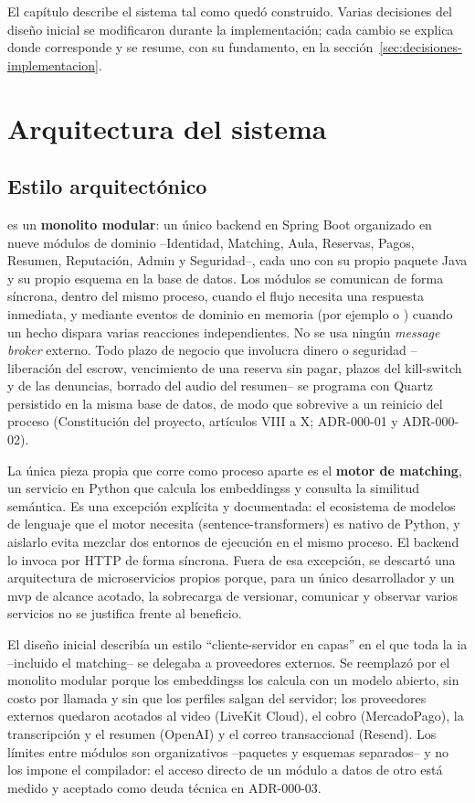 El capítulo describe el sistema tal como quedó construido. Varias
decisiones del diseño inicial se modificaron durante la implementación;
cada cambio se explica donde corresponde y se resume, con su fundamento,
en la sección~\ref{sec:decisiones-implementacion}.

\section{Arquitectura del sistema}

\subsection{Estilo arquitectónico}

\sistema{} es un \textbf{monolito modular}: un único backend en Spring
Boot organizado en nueve módulos de dominio --Identidad, Matching, Aula,
Reservas, Pagos, Resumen, Reputación, Admin y Seguridad--, cada uno con
su propio paquete Java y su propio esquema en la base de datos. Los
módulos se comunican de forma síncrona, dentro del mismo proceso, cuando
el flujo necesita una respuesta inmediata, y mediante eventos de dominio
en memoria (por ejemplo  o
) cuando un hecho dispara varias reacciones
independientes. No se usa ningún \emph{message broker} externo. Todo plazo
de negocio que involucra dinero o seguridad --liberación del
\gls{escrow}, vencimiento de una reserva sin pagar, plazos del kill-switch
y de las denuncias, borrado del audio del resumen-- se programa con Quartz
persistido en la misma base de datos, de modo que sobrevive a un reinicio
del proceso (Constitución del proyecto, artículos VIII a X; ADR-000-01 y
ADR-000-02).

La única pieza propia que corre como proceso aparte es el \textbf{motor
de \gls{matching}}, un servicio en Python que calcula los
\glspl{embeddings} y consulta la similitud semántica. Es una excepción
explícita y documentada: el ecosistema de modelos de lenguaje que el
motor necesita (sentence-transformers) es nativo de Python, y aislarlo
evita mezclar dos entornos de ejecución en el mismo proceso. El backend
lo invoca por HTTP de forma síncrona. Fuera de esa excepción, se descartó
una arquitectura de microservicios propios porque, para un único
desarrollador y un \gls{mvp} de alcance acotado, la sobrecarga de
versionar, comunicar y observar varios servicios no se justifica frente
al beneficio.

El diseño inicial describía un estilo ``cliente-servidor en capas'' en
el que toda la \gls{ia} --incluido el \gls{matching}-- se delegaba a
proveedores externos. Se reemplazó por el monolito modular porque los
\glspl{embeddings} los calcula \sistema{} con un modelo abierto, sin costo
por llamada y sin que los perfiles salgan del servidor; los proveedores
externos quedaron acotados al video (LiveKit Cloud), el cobro
(MercadoPago), la transcripción y el resumen (OpenAI) y el correo
transaccional (Resend). Los límites entre módulos son organizativos
--paquetes y esquemas separados-- y no los impone el compilador: el
acceso directo de un módulo a datos de otro está medido y aceptado como
deuda técnica en ADR-000-03.

